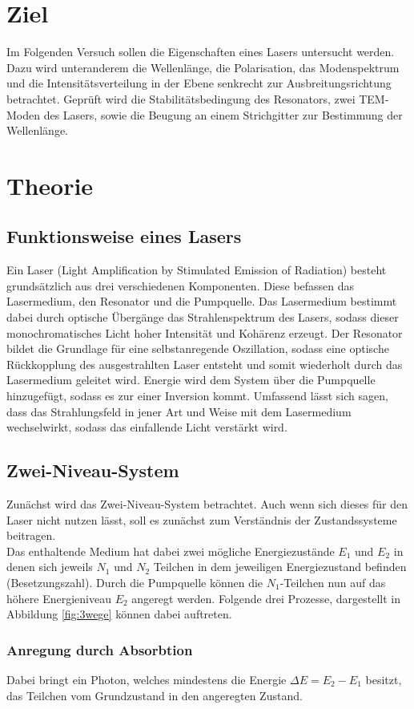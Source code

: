 \section*{Ziel}
Im Folgenden Versuch sollen die Eigenschaften eines Lasers untersucht werden. 
Dazu wird unteranderem die Wellenlänge, die Polarisation, das Modenspektrum und die Intensitätsverteilung in der Ebene senkrecht zur Ausbreitungsrichtung betrachtet.
Geprüft wird die Stabilitätsbedingung des Resonators, zwei TEM-Moden des Lasers, sowie die Beugung an einem Strichgitter zur Bestimmung der Wellenlänge.
\section{Theorie}
\subsection{Funktionsweise eines Lasers}
Ein Laser (Light Amplification by Stimulated Emission of Radiation) besteht grundsätzlich aus drei verschiedenen
Komponenten. Diese befassen das Lasermedium, den Resonator und die Pumpquelle. Das Lasermedium bestimmt dabei durch optische Übergänge
das Strahlenspektrum des Lasers, sodass dieser monochromatisches Licht hoher Intensität und Kohärenz erzeugt.
Der Resonator bildet die Grundlage für eine selbstanregende Oszillation, sodass eine optische Rückkopplung des ausgestrahlten Laser entsteht und somit wiederholt
durch das Lasermedium geleitet wird. Energie wird dem System über die Pumpquelle hinzugefügt, sodass es zur einer Inversion kommt.
Umfassend lässt sich sagen, dass das Strahlungsfeld in jener Art und Weise mit dem Lasermedium wechselwirkt, sodass das einfallende Licht verstärkt wird.
\subsection{Zwei-Niveau-System}
Zunächst wird das Zwei-Niveau-System betrachtet. Auch wenn sich dieses für den Laser nicht nutzen lässt, soll es zunächst zum
Verständnis der Zustandssysteme beitragen.\\
Das enthaltende Medium hat dabei zwei mögliche Energiezustände $E_1$ und $E_2$ in denen sich jeweils $N_1$ und $N_2$ Teilchen in dem jeweiligen Energiezustand befinden (Besetzungszahl).
Durch die Pumpquelle können die $N_1$-Teilchen nun auf das höhere Energieniveau $E_2$ angeregt werden.
Folgende drei Prozesse, dargestellt in Abbildung \ref{fig:3wege} können dabei auftreten.
\subsubsection*{Anregung durch Absorbtion}
Dabei bringt ein Photon, welches mindestens die Energie $\Delta E=E_2-E_1$ besitzt, das Teilchen vom Grundzustand in den angeregten Zustand.

